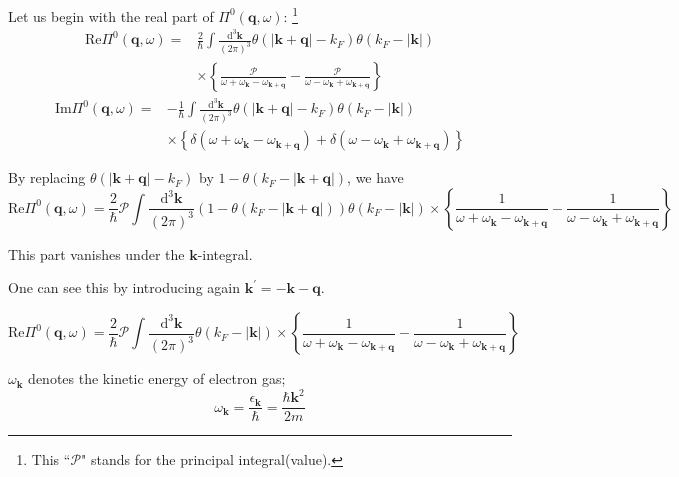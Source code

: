 Let us begin with the real part of $\Pi^0(\mathbf{q},\omega)$:
\footnote{This ``$\mathscr{P}$" stands for the principal integral(value).}
\begin{equation} \label{Eqs2.8.15} \begin{split}
\text{Re} \Pi^0(\mathbf{q},\omega) =& \frac{2}{\hbar} \int \frac{\mathrm{d}^3 \mathbf{k}}{(2\pi)^3} \theta(|\mathbf{k}+\mathbf{q}|-k_F)\theta(k_F - |\mathbf{k}|)\\
& \times \left\{ \frac{\mathscr{P}}{\omega+\omega_{\mathbf{k}}- \omega_{\mathbf{k}+\mathbf{q}}} - \frac{\mathscr{P}}{\omega-\omega_{\mathbf{k}}+ \omega_{\mathbf{k}+\mathbf{q}}} \right\}
\end{split}\end{equation}
\begin{equation} \label{Eqs2.8.16} \begin{split}
\text{Im} \Pi^0(\mathbf{q},\omega) =& -\frac{1}{\hbar} \int \frac{\mathrm{d}^3 \mathbf{k}}{(2\pi)^3} \theta(|\mathbf{k}+\mathbf{q}|-k_F)\theta(k_F - |\mathbf{k}|) \\
&\times \left\{ \delta(\omega+\omega_{\mathbf{k}}- \omega_{\mathbf{k}+\mathbf{q}}) + \delta(\omega-\omega_{\mathbf{k}}+ \omega_{\mathbf{k}+\mathbf{q}}) \right\}
\end{split}\end{equation}

By replacing $\theta(|\mathbf{k}+\mathbf{q}|-k_F)$ by $1-\theta(k_F - |\mathbf{k}+\mathbf{q}|)$, we have
\[ \text{Re} \Pi^0(\mathbf{q},\omega) = \frac{2}{\hbar} \mathscr{P} \int \frac{\mathrm{d}^3 \mathbf{k}}{(2\pi)^3} \left( 1-\theta(k_F-|\mathbf{k}+\mathbf{q}|)\right)\theta(k_F - |\mathbf{k}|) \times \left\{ \frac{1}{\omega+\omega_{\mathbf{k}}- \omega_{\mathbf{k}+\mathbf{q}}} - \frac{1}{\omega-\omega_{\mathbf{k}}+ \omega_{\mathbf{k}+\mathbf{q}}} \right\}
\]

This part vanishes under the $\mathbf{k}$-integral.

One can see this by introducing again $\mathbf{k}^{'}=-\mathbf{k}-\mathbf{q}$.

\[ \text{Re} \Pi^0(\mathbf{q},\omega) = \frac{2}{\hbar} \mathscr{P} \int \frac{\mathrm{d}^3 \mathbf{k}}{(2\pi)^3} \theta(k_F - |\mathbf{k}|) \times \left\{ \frac{1}{\omega+\omega_{\mathbf{k}}- \omega_{\mathbf{k}+\mathbf{q}}} - \frac{1}{\omega-\omega_{\mathbf{k}}+ \omega_{\mathbf{k}+\mathbf{q}}} \right\}
\]

$\omega_{\mathbf{k}}$ denotes the kinetic energy of electron gas;
\[ \omega_{\mathbf{k}} = \frac{\epsilon_{\mathbf{k}}}{\hbar} = \frac{\hbar \mathbf{k}^2}{2m} \]

